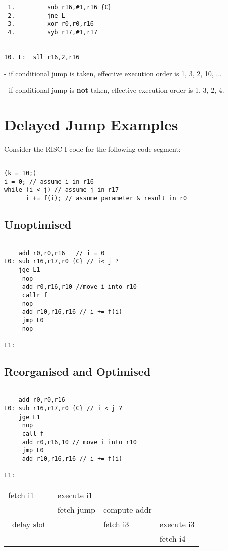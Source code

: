 \documentclass[a4paper,12pt]{article}
\begin{document}
\begin{verbatim}
 1. 		sub r16,#1,r16 {C}
 2. 		jne L
 3. 		xor r0,r0,r16
 4. 		syb r17,#1,r17


10. L:	sll r16,2,r16
\end{verbatim}

- if conditional jump is taken, effective execution order is 1, 3, 2,
  10, ...

- if conditional jump is \textbf{not} taken, effective execution order
  is 1, 3, 2, 4.

\section*{Delayed Jump Examples}

Consider the RISC-I code for the following code segment:

\begin{verbatim}

(k = 10;)
i = 0; // assume i in r16
while (i < j) // assume j in r17
      i += f(i); // assume parameter & result in r0

\end{verbatim}

\subsection*{Unoptimised}

\begin{verbatim}

    add r0,r0,r16	// i = 0
L0: sub r16,r17,r0 {C} // i< j ?
    jge L1
	 nop
	 add r0,r16,r10 //move i into r10
	 callr f
	 nop
	 add r10,r16,r16 // i += f(i)
	 jmp L0
	 nop

L1: 

\end{verbatim}

\subsection*{Reorganised and Optimised}

\begin{verbatim}

    add r0,r0,r16
L0: sub r16,r17,r0 {C} // i < j ?
    jge L1
	 nop
	 call f
	 add r0,r16,10 // move i into r10
	 jmp L0
	 add r10,r16,r16 // i += f(i)

L1:

\end{verbatim}

\begin{tabular}{|l|l|l|l|}
fetch i1 		& execute i1 	&						&					\\
					& fetch jump 	& compute addr		&					\\
--delay slot--	&		 			& fetch i3			& execute i3	\\
					&					&						& fetch i4		\\
\end{tabular}
\end{document}
